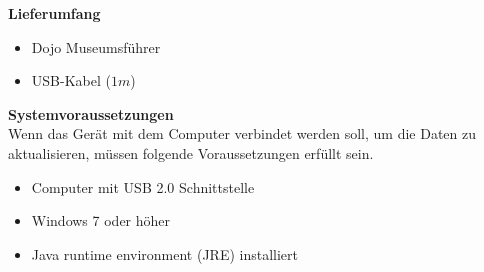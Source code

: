 \textbf{Lieferumfang}

\begin{itemize}
\item Dojo Museumsführer
\end{itemize}
\begin{itemize}
\item USB-Kabel ($1m$)
\end{itemize}
\textbf{Systemvoraussetzungen}
\\[4mm]
Wenn das Gerät mit dem Computer verbindet werden soll, um die Daten zu aktualisieren, müssen folgende Voraussetzungen erfüllt sein.
\begin{itemize}
\item Computer mit USB 2.0 Schnittstelle
\end{itemize}
\begin{itemize}
\item Windows 7 oder höher
\end{itemize}
\begin{itemize}
\item Java runtime environment (JRE) installiert
\end{itemize}
